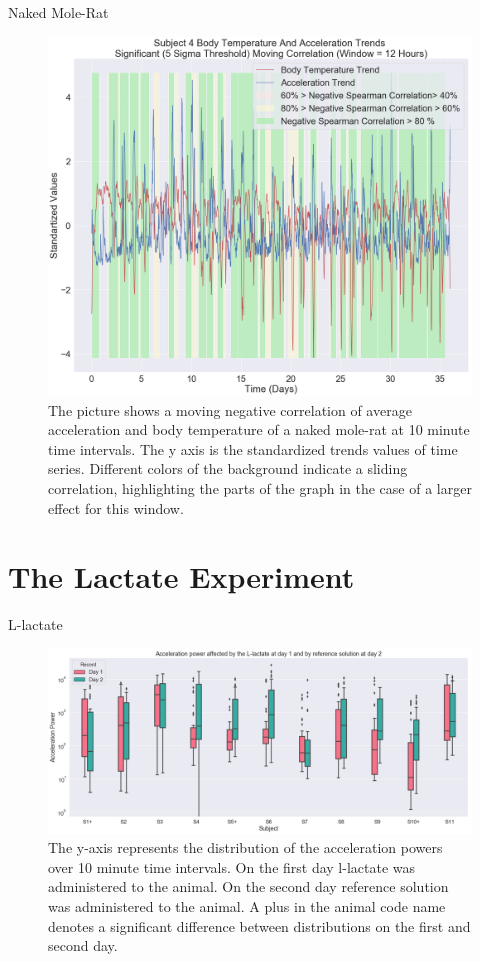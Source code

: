 \documentclass[10pt]{beamer}
\begin{document}
\begin{frame}[fragile]{Naked Mole-Rat}
\begin{figure}[H]
\centering
\includegraphics[width=0.6\linewidth]{exp3_4.png}
\caption{The picture shows a moving negative correlation of average acceleration and body temperature of a naked mole-rat at 10 minute time intervals. The y axis is the standardized trends values of time series. Different colors of the background indicate a sliding correlation, highlighting the parts of the graph in the case of a larger effect for this window.}\label{fig:lactate_receptors}
\end{figure}
\end{frame}

\section{The Lactate Experiment}

\begin{frame}[fragile]{L-lactate}
\begin{figure}[H]
\centering
\includegraphics[width=0.9\linewidth]{exp4_1.png}
\caption{The y-axis represents the distribution of the acceleration powers over 10 minute time intervals. On the first day l-lactate was administered to the animal. On the second day reference solution was administered to the animal. A plus in the animal code name denotes a significant difference between distributions on the first and second day.}\label{fig:lactate_receptors}
\end{figure}
\end{frame}
\end{document}
